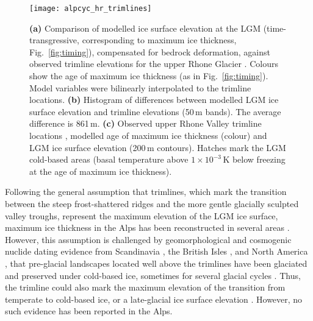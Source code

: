 \documentclass[tc, manuscript]{copernicus}
\begin{document}
    \begin{figure}[t]
      \centerline{\texttt{[image: alpcyc\_hr\_trimlines]}}
      \caption{%
        \textbf{(a)} Comparison of modelled ice surface elevation at the LGM
        (time-transgressive, corresponding to maximum ice thickness,
        Fig.~\ref{fig:timing}), compensated for bedrock deformation, against
        observed trimline elevations for the upper Rhone Glacier
        \citep[Table~1]{Kelly.etal.2004}. Colours
        show the age of maximum ice thickness (as in Fig.~\ref{fig:timing}).
        Model variables were bilinearly interpolated to the trimline locations.
        \textbf{(b)} Histogram of differences between modelled LGM ice surface
        elevation and trimline elevations (50\,m bands). The average
        difference is 861\,m.
        \textbf{(c)} Observed upper Rhone Valley trimline locations
        \citep[Table~1]{Kelly.etal.2004}, modelled age of maximum ice thickness
        (colour) and LGM ice surface elevation (200\,m contours). Hatches mark
        the LGM cold-based areas (basal temperature above $1 \times 10^{-3}$\,K
        below freezing at the age of maximum ice thickness).}
      \label{fig:trimlines}
    \end{figure}

    Following the general assumption that trimlines, which mark the transition
    between the steep frost-shattered ridges and the more gentle glacially sculpted
    valley troughs, represent the maximum elevation of the LGM ice surface,
    maximum ice thickness in the Alps has been reconstructed in several areas
    \citep{Husen.1987, Florineth.1998, Florineth.Schluchter.1998,
    Kelly.etal.2004, Bini.etal.2009, Coutterand.2010, Cossart.etal.2012}.
    However, this assumption is challenged by geomorphological and cosmogenic
    nuclide dating evidence from
    Scandinavia \citep[e.g.,][]{Kleman.1994, Kleman.Borgstrom.1994}, the
    British Isles \citep[e.g.,][]{Fabel.etal.2012, Ballantyne.Stone.2015}, and
    North America \citep[e.g.,][]{Kleman.etal.2010}, that pre-glacial landscapes
    located well above the trimlines have been glaciated and preserved
    under cold-based ice, sometimes for several glacial cycles
    \citep{Stroeven.etal.2002}. Thus, the trimline could also mark the
    maximum elevation of the transition from temperate to cold-based ice, or a
    late-glacial ice surface elevation \citep[Fig.~1, p.~403]{Coutterand.2010}.
    However, no such evidence has been reported in the Alps.
\end{document}
